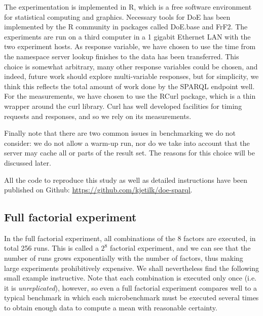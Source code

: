 \documentclass{llncs}
\begin{document}
The experimentation is implemented in R\cite{rmanual}, which is a free
software environment for statistical computing and graphics. Necessary
tools for DoE has been implemented by the R community in packages
called DoE.base\cite{doebase} and FrF2\cite{frf2}. The experiments are
run on a third computer in a 1 gigabit Ethernet LAN with the two
experiment hosts.  As response variable, we have chosen to use the
time from the namespace server lookup finishes to the data has been
transferred. This choice is somewhat arbitrary, many other response
variables could be chosen, and indeed, future work should explore
multi-variable responses, but for simplicity, we think this reflects
the total amount of work done by the SPARQL endpoint well. For the
measurements, we have chosen to use the RCurl package\cite{lang2007r},
which is a thin wrapper around the curl library. Curl has well
developed facilities for timing requests and responses, and so we rely
on its measurements.

Finally note that there are two common issues in benchmarking we do
not consider: we do not allow a warm-up run, nor do we take into
account that the server may cache all or parts of the result set. The
reasons for this choice will be discussed later.

All the code to reproduce this study as well as detailed instructions
have been published on Github: \url{https://github.com/kjetilk/doe-sparql}.

\subsection{Full factorial experiment}\label{sec:full}

In the full factorial experiment, all combinations of the 8 factors
are executed, in total 256 runs. This is called a $2^8$ factorial
experiment, and we can see that the number of runs grows exponentially
with the number of factors, thus making large experiments
prohibitively expensive. We shall nevertheless find the following
small example instructive. Note that each combination is executed only
once (i.e. it is \emph{unreplicated}), however, so even a full
factorial experiment compares well to a typical benchmark in which
each microbenchmark must be executed several times to obtain enough
data to compute a mean with reasonable certainty.
\end{document}
